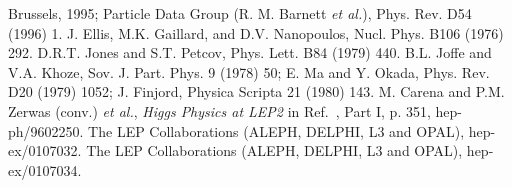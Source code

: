 \begin{thebibliography}{999}
Brussels, 1995; Particle Data Group (R. M. Barnett {\it et al.}), Phys. Rev. 
D54 (1996) 1.
%
J. Ellis, M.K. Gaillard, and D.V. Nanopoulos, Nucl. Phys.  B106 (1976) 292.
%
 D.R.T. Jones and S.T. Petcov, Phys. Lett. B84 (1979) 440.
%
 B.L. Joffe and V.A. Khoze, Sov. J. Part. Phys. 9 
(1978) 50; E. Ma and Y. Okada, Phys. Rev. D20 (1979) 1052;  
J. Finjord, Physica Scripta 21 (1980) 143.    
%
 M. Carena and P.M. Zerwas (conv.) {\it et al.}, {\it 
Higgs Physics at LEP2} in Ref.~\cite{W-Physics}, Part I, p. 351,  
hep-ph/9602250. 
%
 The LEP Collaborations (ALEPH, DELPHI, L3 and 
OPAL), hep-ex/0107032.
%
 The LEP Collaborations (ALEPH, DELPHI, L3 and 
OPAL), hep-ex/0107034.


\end{thebibliography}
